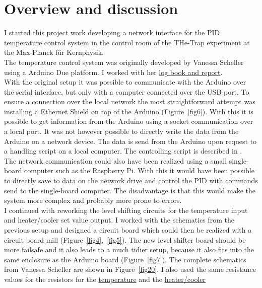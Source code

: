\documentclass[12pt]{scrartcl}
\begin{document}
  \section{Overview and discussion}
    I started this project work developing a network interface for the PID
    temperature control system in the control room of the THe-Trap experiment at
    the Max-Planck für Kernphysik.\\
    The temperature control system was originally developed by Vanessa Scheller
    using a Arduino Due platform. I worked with her
    \href{https://www.mpi-hd.mpg.de/THeWiki/index.php/Temperature_stabilization}{log book and report}.\\
    With the original setup it was possible
    to communicate with the Arduino over the serial interface, but only with a
    computer connected over the USB-port. To ensure a connection over the local
    network the most straightforward attempt was installing a Ethernet Shield on
    top of the Arduino (Figure~\ref{fig6}). With this it is possible to get
    information from the Arduino using a socket communication over a local port.
    It was not however possible to directly write the data from the Arduino on
    a network device. The data is send from the Arduino upon request to a handling
    script on a local computer. The controlling script is described in
    .\\
    The network communication could also have been realized using a small
    single-board computer such as the Raspberry Pi. With this it would have been
    possible to directly save to data on the network drive and control the PID
    with commands send to the single-board computer. The disadvantage is that
    this would make the system more complex and probably more prone to errors.\\
    I continued with reworking the level shifting circuits for the temperature
    input and heater/cooler set value output. I worked with the schematics from
    the previous setup and designed a circuit board which could then be realized
    with a circuit board mill (Figure~\ref{fig4},~\ref{fig5}). The new
    level shifter board should be more failsafe and it also leads to a much
    tidier setup, because it also fits into the same enclosure as the Arduino
    board (Figure~\ref{fig7}).
    The complete schematics from Vanessa Scheller are shown in Figure~\ref{fig20}.
    I also used the same resistance values for the resistors for the
    \hyperref[tempres]{temperature} and the \hyperref[hcres]{heater/cooler}
\end{document}
